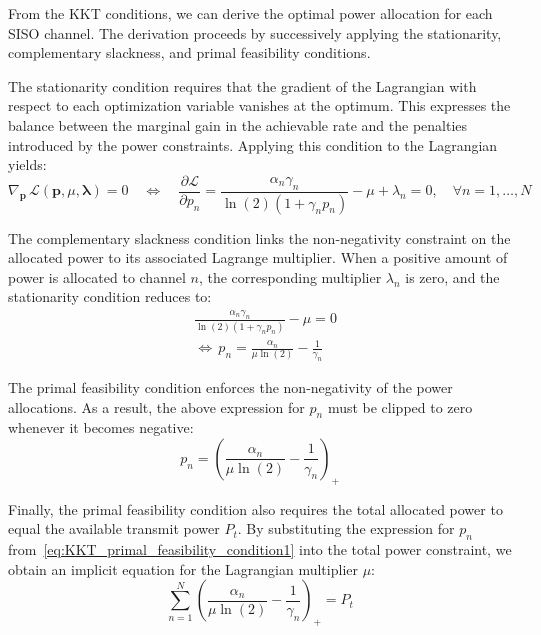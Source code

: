 From the \ac{KKT} conditions, we can derive the optimal power allocation for each \ac{SISO} channel. The derivation proceeds by successively applying the stationarity, complementary slackness, and primal feasibility conditions.

The stationarity condition requires that the gradient of the Lagrangian with respect to each optimization variable vanishes at the optimum. This expresses the balance between the marginal gain in the achievable rate and the penalties introduced by the power constraints. Applying this condition to the Lagrangian yields:
\begin{equation}
\label{eq:KKT_stationarity_condition}
    \nabla_{\mathbf{p}} \, \mathcal{L}(\mathbf{p}, \mu, \boldsymbol{\lambda}) = 0
    \quad \iff \quad
    \frac{\partial \mathcal{L}}{\partial p_n} = \frac{\alpha_n \gamma_n}{\ln(2) \left( 1 + \gamma_n p_n \right)} - \mu + \lambda_n = 0, \quad \forall n = 1, \dots, N
\end{equation}

The complementary slackness condition links the non-negativity constraint on the allocated power to its associated Lagrange multiplier. When a positive amount of power is allocated to channel $n$, the corresponding multiplier $\lambda_n$ is zero, and the stationarity condition reduces to:
\begin{subequations}
\label{eq:KKT_complementary_slackness_condition}
\begin{align}
    & \frac{\alpha_n \gamma_n}{\ln(2) (1 + \gamma_n p_n)} - \mu = 0 \\
    & \iff \, p_n = \frac{\alpha_n}{\mu \ln(2)} - \frac{1}{\gamma_n}
\end{align}
\end{subequations}

The primal feasibility condition enforces the non-negativity of the power allocations. As a result, the above expression for $p_n$ must be clipped to zero whenever it becomes negative:
\begin{equation}
\label{eq:KKT_primal_feasibility_condition1}
    p_n = \left( \frac{\alpha_n}{\mu \ln(2)} - \frac{1}{\gamma_n} \right)_{+}
\end{equation}

Finally, the primal feasibility condition also requires the total allocated power to equal the available transmit power $P_t$. By substituting the expression for $p_n$ from~\eqref{eq:KKT_primal_feasibility_condition1} into the total power constraint, we obtain an implicit equation for the Lagrangian multiplier $\mu$:
\begin{equation}
\label{eq:KKT_primal_feasibility_condition2}
    \sum_{n=1}^{N} \left( \frac{\alpha_n}{\mu \ln(2)} - \frac{1}{\gamma_n} \right)_{+} = P_t
\end{equation}

